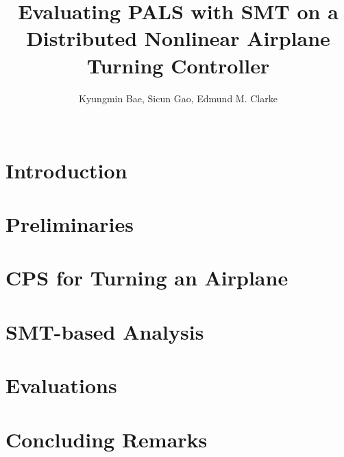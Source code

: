 \documentclass{sig-alternate}
\begin{document}
\title{Evaluating PALS with SMT on a Distributed Nonlinear Airplane Turning Controller
}

\author{
Kyungmin Bae, Sicun Gao, Edmund M. Clarke\\
\\
}

\maketitle
\begin{abstract}
\end{abstract}


\section{Introduction}

\section{Preliminaries}

\section{CPS for Turning an Airplane}

\section{SMT-based Analysis}

\section{Evaluations}

\section{Concluding Remarks}



\end{document}
